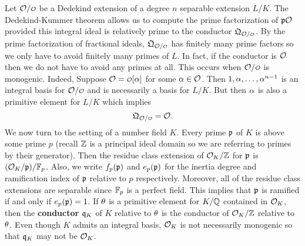     Let $\mc{O}/\smc{O}$ be a Dedekind extension of a degree $n$ separable extension $L/K$. The Dedekind-Kummer theorem allows us to compute the prime factorization of $\mathfrak{p}\mathcal{O}$ provided this integral ideal is relatively prime to the conductor $\mf{Q}_{\mc{O}/\smc{O}}$. By the prime factorization of fractional ideals, $\mf{Q}_{\mc{O}/\smc{O}}$ has finitely many prime factors so we only have to avoid finitely many primes of $L$. In fact, if the conductor is $\mathcal{O}$ then we do not have to avoid any primes at all. This occurs when $\mc{O}/\smc{O}$ is monogenic. Indeed, Suppose $\mc{O} = \smc{O}[\a]$ for some $\alpha \in \mathcal{O}$. Then $1,\alpha,\ldots,\alpha^{n-1}$ is an integral basis for $\mc{O}/\smc{O}$ and is necessarily a basis for $L/K$. But then $\alpha$ is also a primitive element for $L/K$ which implies
    \[
      \mf{Q}_{\mc{O}/\smc{O}} = \mc{O}.
    \]
    We now turn to the setting of a number field $K$. Every prime $\mathfrak{p}$ of $K$ is above some prime $p$ (recall $\mathbb{Z}$ is a principal ideal domain so we are referring to primes by their generator). Then the residue class extension of $\mathcal{O}_{K}/\mathbb{Z}$ for $\mathfrak{p}$ is $(\mathcal{O}_{K}/\mathfrak{p})/\mathbb{F}_{p}$. Also, we write $f_{p}(\mathfrak{p})$ and $e_{p}(\mathfrak{p})$ for the inertia degree and ramification index of $\mathfrak{p}$ relative to $p$ respectively. Moreover, all of the residue class extensions are separable since $\mathbb{F}_{p}$ is a perfect field. This implies that $\mathfrak{p}$ is ramified if and only if $e_{p}(\mathfrak{p}) = 1$. If $\theta$ is a primitive element for $K/\mathbb{Q}$ contained in $\mathcal{O}_{K}$, then the \textbf{conductor} $\mathfrak{q}_{K}$ of $K$ relative to $\theta$ is the conductor of $\mathcal{O}_{K}/\mathbb{Z}$ relative to $\theta$. Even though $K$ admits an integral basis, $\mathcal{O}_{K}$ is not necessarily monogenic so that $\mathfrak{q}_{K}$ may not be $\mathcal{O}_{K}$.
